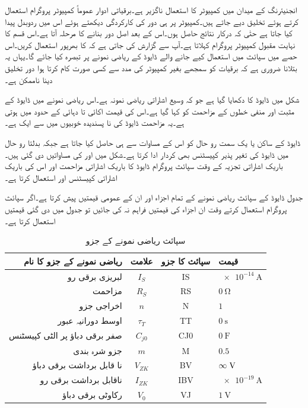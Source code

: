 انجنیئرنگ کے میدان میں کمپیوٹر کا استعمال ناگزیر ہے۔برقیاتی ادوار عموماً کمپیوٹر پروگرام استعمال کرتے ہوئے تخلیق دیے جاتے ہیں۔کمپیوٹر پر ہی دور کی کارکردگی دیکھتے ہوئے اس میں ردوبدل پیدا کیا جاتا ہے حتٰی کہ درکار نتائج حاصل ہوں۔اس کے بعد اصل دور بنانے کا مرحلہ آتا ہے۔اس قسم کا نہایت مقبول کمپیوٹر پروگرام   کہلاتا ہے۔آپ سے گزارش کی جاتی ہے کہ  کا بھرپور  استعمال کریں۔اس حصے میں سپائث میں استعمال کیے جانے والے ڈایوڈ کے ریاضی نمونے پر تبصرہ کیا جائے گا۔یہاں یہ بتلانا ضروری ہے کہ برقیات کو سمجھے بغیر کمپیوٹر کی مدد سے کسی صورت کام کرتا ہوا دور تخلیق دینا ناممکن ہے۔

شکل   میں ڈایوڈ کا  دکھایا گیا ہے جو کہ وسیع اشاراتی ریاضی نمونہ ہے۔اس ریاضی نمونے میں ڈایوڈ کے مثبت اور منفی خطوں کے مزاحمت کو  کہا گیا ہے۔اس کی قیمت اکائی تا دہائی کے حدود میں ہوتی ہے۔یہ مزاحمت ڈایوڈ کی نا پسندیدہ خوبیوں میں سے ایک ہے۔

ڈایوڈ کے ساکن یا یک سمت رو حال کو اس کے    مساوات سے ہی حاصل کیا جاتا ہے جبکہ بدلتا رو حال میں ڈایوڈ کی تغیر پذیر کپیسٹنس  بھی کردار ادا کرتا ہے۔شکل میں   اور  کی مساواتیں دی گئی ہیں۔باریک اشاراتی تجزیہ  کے وقت سپائث پروگرام ڈایوڈ کا باریک اشاراتی مزاحمت  اور اس کی باریک اشاراتی کپیسٹنس  اور  استعمال کرتا ہے۔

جدول   ڈایوڈ کے سپائث ریاضی نمونے کے تمام اجزاء اور ان کے عمومی قیمتیں پیش کرتا ہے۔اگر سپائث پروگرام استعمال کرتے وقت ان اجزاء کی قیمتیں فراہم نہ کی جائیں تو  جدول  میں  دی گئی قیمتیں استعمال کرتا ہے۔
\begin{table}
\caption{سپائث ریاضی نمونے کے جزو}
\label{جدول_سپائث_ماڈل_کے_جزو}
\centering
\begin{tabular}[htp]{r c c l}
\toprule
ریاضی نمونے کے جزو کا نام & علامت & سپائث کا جزو & قیمت \\
\midrule
لبریزی برقی رو   & $ I_S $    & IS & $\SI{e-14}{\ampere}$\\
مزاحمت & $R_S$  & RS & $\SI{0}{\ohm}$ \\
اخراجی جزو & $n$ & N & $1$ \\
اوسط دورانیہ عبور & $\tau_T$ & TT & $\SI{0}{\second}$\\
صفر برقی دباؤ پر الٹی کپیسٹنس & $C_{j0}$ & CJ0 & $\SI{0}{\farad}$\\
جزو شرہ بندی & $m$ & M & $0.5$\\
نا قابل برداشت برقی دباؤ &  $V_{ZK}$ & BV & $\infty \hspace{1mm} \si{\volt}$\\
ناقابل برداشت برقی رو & $I_{ZK}$ & IBV & $\SI{e-19}{\ampere}$\\
رکاوٹی برقی دباؤ & $V_0$ & VJ & $\SI{1}{\volt}$ \\
\bottomrule
\end{tabular}
\end{table}
%

